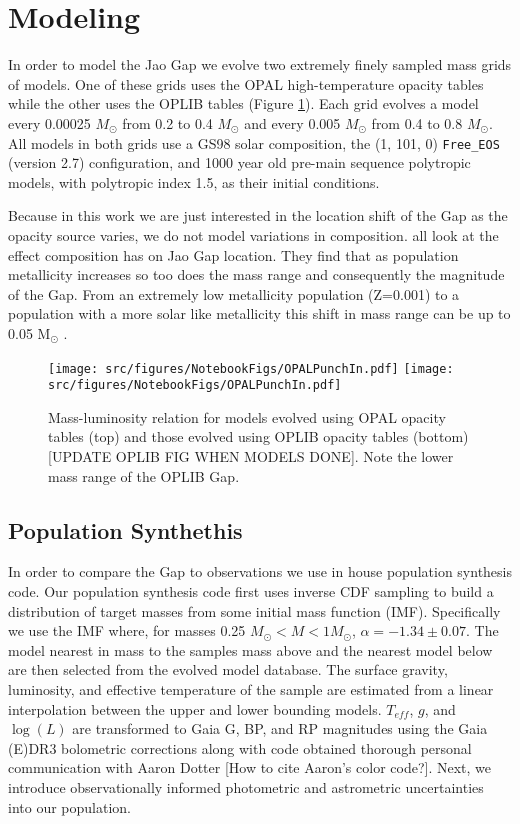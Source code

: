 \section{Modeling}\label{sec:modeling}
In order to model the Jao Gap we evolve two extremely finely sampled mass grids
of models. One of these grids uses the OPAL high-temperature opacity tables
while the other uses the OPLIB tables (Figure \ref{fig:PunchIn}). Each grid
evolves a model every 0.00025 $M_{\odot}$ from 0.2 to 0.4 $M_{\odot}$ and every
0.005 $M_{\odot}$ from 0.4 to 0.8 $M_{\odot}$. All models in both grids use a
GS98 solar composition, the (1, 101, 0) \texttt{Free\_EOS} (version
{\color{red}2.7}) configuration, and 1000 year old pre-main sequence polytropic
models, with polytropic index 1.5, as their initial conditions.

Because in this work we are just interested in the location shift of the Gap as
the opacity source varies, we do not model variations in composition.
\citet{Mansfield2021,Jao2020,Feiden2021} all look at the effect composition has
on Jao Gap location. They find that as population metallicity increases so too
does the mass range and consequently the magnitude of the Gap. From an extremely
low metallicity population (Z=0.001) to a population with a more solar like
metallicity this shift in mass range can be up to 0.05 M$_{\odot}$
\citep{Mansfield2021}.

\begin{figure}
	\centering
	\texttt{[image: src/figures/NotebookFigs/OPALPunchIn.pdf]}
	\texttt{[image: src/figures/NotebookFigs/OPALPunchIn.pdf]}
	\caption{Mass-luminosity relation for models evolved using OPAL opacity
	tables (top) and those evolved using OPLIB opacity tables (bottom)
	{\color{red}[UPDATE OPLIB FIG WHEN MODELS DONE]}. Note the lower mass range
	of the OPLIB Gap.}
	\label{fig:PunchIn}
		
\end{figure}

\subsection{Population Synthethis}
In order to compare the Gap to observations we use in house population
synthesis code. Our population synthesis code first uses inverse CDF sampling
to build a distribution of target masses from some initial mass function (IMF).
Specifically we use the \citet{Sollima2019} IMF where, for masses 0.25
$M_{\odot} < M < 1 M_{\odot}$, $\alpha=-1.34\pm0.07$. The model nearest in mass
to the samples mass above and the nearest model below are then selected from
the evolved model database. The surface gravity, luminosity, and effective
temperature of the sample are estimated from a linear interpolation between the
upper and lower bounding models. $T_{eff}$, $g$, and $\log(L)$ are transformed
to Gaia G, BP, and RP magnitudes using the Gaia (E)DR3 bolometric corrections
\citep{Creevey2022} along with code obtained thorough personal communication
with Aaron Dotter {\color{red}[How to cite Aaron's color code?]}. Next, we
introduce observationally informed photometric and astrometric uncertainties
into our population.

